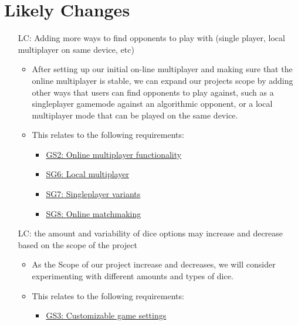 \section{Likely Changes}    

\noindent \begin{itemize}

\item[LC\refstepcounter{lcnum}\thelcnum \label{LC_find_opp}:] Adding more ways to find opponents to play with (single player, local multiplayer on same device, etc)

\begin{itemize}
	\item After setting up our initial on-line multiplayer and making sure that the online multiplayer is stable, we can expand our projects scope by adding other ways that users can find opponents to play against, such as a singleplayer gamemode against an algorithmic opponent, or a local multiplayer mode that can be played on the same device.
	\item This relates to the following requirements: 
	\begin{itemize}
		\item \hyperref[G_multiplayer]{GS2: Online multiplayer functionality}
		\item \hyperref[G_local_multiplayer]{SG6: Local multiplayer}
		\item \hyperref[G_singleplayer]{SG7: Singleplayer variants}
		\item \hyperref[G_matchmaking]{SG8: Online matchmaking}
	\end{itemize}
\end{itemize}

\item[LC\refstepcounter{lcnum}\thelcnum \label{LC_dice}:] the amount and variability of dice options may increase and decrease based on the scope of the project

\begin{itemize}
	\item As the Scope of our project increase and decreases, we will consider experimenting with different amounts and types of dice.
	\item This relates to the following requirements: 
	\begin{itemize}
		\item \hyperref[G_customization]{GS3: Customizable game settings}
	\end{itemize}
\end{itemize}


\end{itemize}
